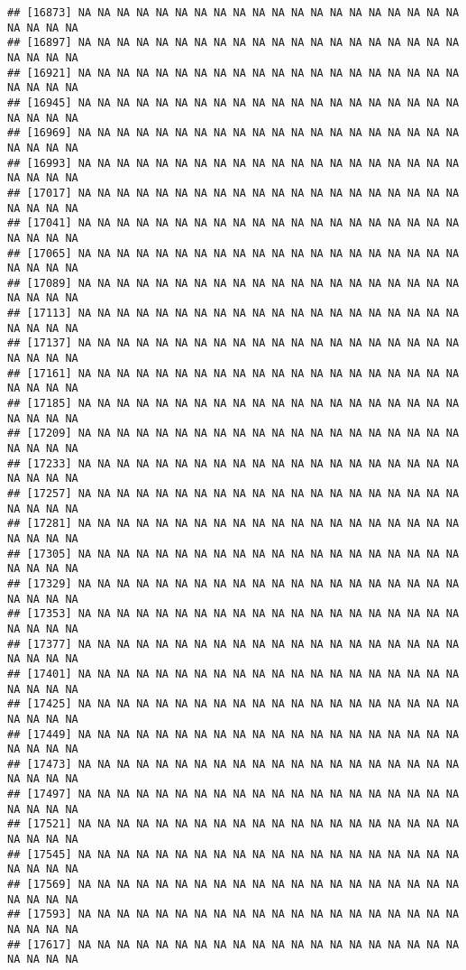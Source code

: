 \documentclass[
]{article}
\begin{document}
\begin{verbatim}
## [16873] NA NA NA NA NA NA NA NA NA NA NA NA NA NA NA NA NA NA NA NA NA NA NA NA
## [16897] NA NA NA NA NA NA NA NA NA NA NA NA NA NA NA NA NA NA NA NA NA NA NA NA
## [16921] NA NA NA NA NA NA NA NA NA NA NA NA NA NA NA NA NA NA NA NA NA NA NA NA
## [16945] NA NA NA NA NA NA NA NA NA NA NA NA NA NA NA NA NA NA NA NA NA NA NA NA
## [16969] NA NA NA NA NA NA NA NA NA NA NA NA NA NA NA NA NA NA NA NA NA NA NA NA
## [16993] NA NA NA NA NA NA NA NA NA NA NA NA NA NA NA NA NA NA NA NA NA NA NA NA
## [17017] NA NA NA NA NA NA NA NA NA NA NA NA NA NA NA NA NA NA NA NA NA NA NA NA
## [17041] NA NA NA NA NA NA NA NA NA NA NA NA NA NA NA NA NA NA NA NA NA NA NA NA
## [17065] NA NA NA NA NA NA NA NA NA NA NA NA NA NA NA NA NA NA NA NA NA NA NA NA
## [17089] NA NA NA NA NA NA NA NA NA NA NA NA NA NA NA NA NA NA NA NA NA NA NA NA
## [17113] NA NA NA NA NA NA NA NA NA NA NA NA NA NA NA NA NA NA NA NA NA NA NA NA
## [17137] NA NA NA NA NA NA NA NA NA NA NA NA NA NA NA NA NA NA NA NA NA NA NA NA
## [17161] NA NA NA NA NA NA NA NA NA NA NA NA NA NA NA NA NA NA NA NA NA NA NA NA
## [17185] NA NA NA NA NA NA NA NA NA NA NA NA NA NA NA NA NA NA NA NA NA NA NA NA
## [17209] NA NA NA NA NA NA NA NA NA NA NA NA NA NA NA NA NA NA NA NA NA NA NA NA
## [17233] NA NA NA NA NA NA NA NA NA NA NA NA NA NA NA NA NA NA NA NA NA NA NA NA
## [17257] NA NA NA NA NA NA NA NA NA NA NA NA NA NA NA NA NA NA NA NA NA NA NA NA
## [17281] NA NA NA NA NA NA NA NA NA NA NA NA NA NA NA NA NA NA NA NA NA NA NA NA
## [17305] NA NA NA NA NA NA NA NA NA NA NA NA NA NA NA NA NA NA NA NA NA NA NA NA
## [17329] NA NA NA NA NA NA NA NA NA NA NA NA NA NA NA NA NA NA NA NA NA NA NA NA
## [17353] NA NA NA NA NA NA NA NA NA NA NA NA NA NA NA NA NA NA NA NA NA NA NA NA
## [17377] NA NA NA NA NA NA NA NA NA NA NA NA NA NA NA NA NA NA NA NA NA NA NA NA
## [17401] NA NA NA NA NA NA NA NA NA NA NA NA NA NA NA NA NA NA NA NA NA NA NA NA
## [17425] NA NA NA NA NA NA NA NA NA NA NA NA NA NA NA NA NA NA NA NA NA NA NA NA
## [17449] NA NA NA NA NA NA NA NA NA NA NA NA NA NA NA NA NA NA NA NA NA NA NA NA
## [17473] NA NA NA NA NA NA NA NA NA NA NA NA NA NA NA NA NA NA NA NA NA NA NA NA
## [17497] NA NA NA NA NA NA NA NA NA NA NA NA NA NA NA NA NA NA NA NA NA NA NA NA
## [17521] NA NA NA NA NA NA NA NA NA NA NA NA NA NA NA NA NA NA NA NA NA NA NA NA
## [17545] NA NA NA NA NA NA NA NA NA NA NA NA NA NA NA NA NA NA NA NA NA NA NA NA
## [17569] NA NA NA NA NA NA NA NA NA NA NA NA NA NA NA NA NA NA NA NA NA NA NA NA
## [17593] NA NA NA NA NA NA NA NA NA NA NA NA NA NA NA NA NA NA NA NA NA NA NA NA
## [17617] NA NA NA NA NA NA NA NA NA NA NA NA NA NA NA NA NA NA NA NA NA NA NA NA

\end{verbatim}
\end{document}
